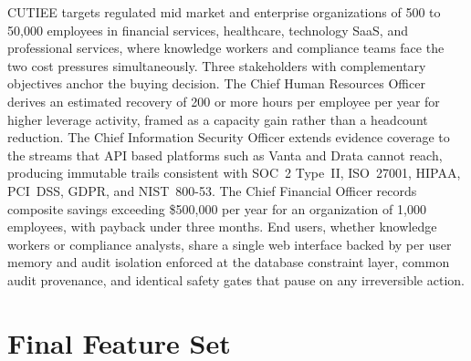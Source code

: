 \documentclass{article}
\theoremstyle{plain}
\theoremstyle{definition}
\theoremstyle{remark}
\begin{document}
CUTIEE targets regulated mid market and enterprise organizations of 500 to 50{,}000 employees in financial services, healthcare, technology SaaS, and professional services, where knowledge workers and compliance teams face the two cost pressures simultaneously. Three stakeholders with complementary objectives anchor the buying decision. The Chief Human Resources Officer derives an estimated recovery of 200 or more hours per employee per year for higher leverage activity, framed as a capacity gain rather than a headcount reduction. The Chief Information Security Officer extends evidence coverage to the streams that API based platforms such as Vanta and Drata cannot reach, producing immutable trails consistent with SOC~2 Type~II, ISO~27001, HIPAA, PCI~DSS, GDPR, and NIST~800-53. The Chief Financial Officer records composite savings exceeding \$500{,}000 per year for an organization of 1{,}000 employees, with payback under three months. End users, whether knowledge workers or compliance analysts, share a single web interface backed by per user memory and audit isolation enforced at the database constraint layer, common audit provenance, and identical safety gates that pause on any irreversible action.

\section{Final Feature Set}
\label{sec:features}
\end{document}
